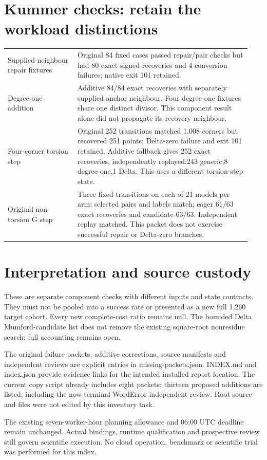 \documentclass[10 pt]{article}
\begin{document}
\section*{Kummer checks: retain the workload distinctions}
\begin{tabular}{p{0.27\linewidth}p{0.67\linewidth}}
Supplied-neighbour repair fixtures & Original 84 fixed cases passed repair/pair checks but had 80 exact signed recoveries and 4 conversion failures; native exit 101 retained.\\[5 pt]
Degree-one addition & Additive 84/84 exact recoveries with separately supplied anchor neighbour. Four degree-one fixtures share one distinct divisor. This component result alone did not propagate its recovery neighbour.\\[5 pt]
Four-corner torsion step & Original 252 transitions matched 1,008 corners but recovered 251 points; Delta-zero failure and exit 101 retained. Additive fallback gives 252 exact recoveries, independently replayed:243 generic,8 degree-one,1 Delta. This uses a different torsion-step state.\\[5 pt]
Original non-torsion G step & Three fixed transitions on each of 21 models per arm: selected pairs and labels match; eager 61/63 exact recoveries and candidate 63/63. Independent replay matched. This packet does not exercise successful repair or Delta-zero branches.\\
\end{tabular}
\section*{Interpretation and source custody}
These are separate component checks with different inputs and state contracts. They must not be pooled into a success rate or presented as a new full 1,260 target cohort. Every new complete-cost ratio remains null. The bounded Delta Mumford-candidate list does not remove the existing square-root nonresidue search; full accounting remains open.

The original failure packets, additive corrections, source manifests and independent reviews are explicit entries in missing-packets.json. INDEX.md and index.json provide evidence links for the intended installed report location. The current copy script already includes eight packets; thirteen proposed additions are listed, including the now-terminal WordError independent review. Root source and files were not edited by this inventory task.

The existing seven-worker-hour planning allowance and 06:00 UTC deadline remain unchanged. Actual bindings, runtime qualification and prospective review still govern scientific execution. No cloud operation, benchmark or scientific trial was performed for this index.
\end{document}
